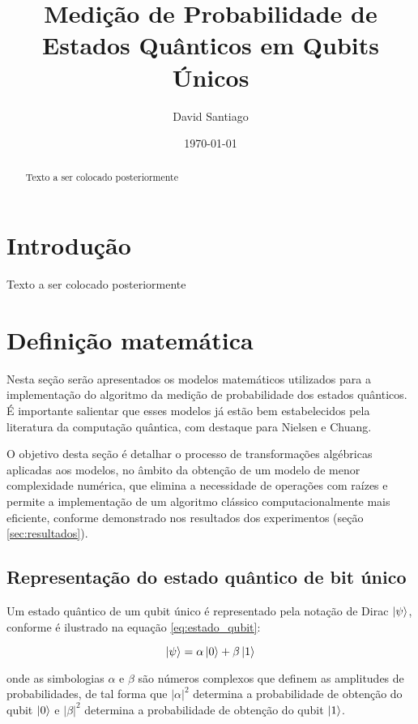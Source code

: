 \documentclass[12pt, a4paper]{article}
\title{Medição de Probabilidade de Estados Quânticos em Qubits Únicos}
\author{David Santiago}
\date{\today}
\begin{document}
\maketitle

\begin{abstract}
Texto a ser colocado posteriormente
\end{abstract}


\section{Introdução}
\label{sec:intro}
Texto a ser colocado posteriormente

\section{Definição matemática}
\label{sec:definicao_mate}

Nesta seção serão apresentados os modelos matemáticos utilizados para a implementação do algoritmo da medição de probabilidade dos estados quânticos. É importante salientar que esses modelos já estão bem estabelecidos pela literatura da computação quântica, com destaque para Nielsen e Chuang\cite{nielsen2010}.

O objetivo desta seção é detalhar o processo de transformações algébricas aplicadas aos modelos, no âmbito da obtenção de um modelo de menor complexidade numérica, que elimina a necessidade de operações com raízes e permite a implementação de um algoritmo clássico computacionalmente mais eficiente, conforme demonstrado nos resultados dos experimentos (seção \ref{sec:resultados}).

\subsection{Representação do estado quântico de bit único \label{sec:rep_estados_quanticos}}

Um estado quântico de um qubit único é representado pela notação de Dirac \(\ket{\psi}\), conforme é ilustrado na equação \eqref{eq:estado_qubit}:

\begin{equation}
\ket{\psi} = \alpha\ket{0} + \beta\ket{1}
\label{eq:estado_qubit}
\end{equation}

onde as simbologias \(\alpha\) e \(\beta\) são números complexos que definem as amplitudes de probabilidades, de tal forma que \(|\alpha|^2\) determina a probabilidade de obtenção do qubit \(\ket{0}\) e \(|\beta|^2\) determina a probabilidade de obtenção do qubit \(\ket{1}\).
\end{document}
